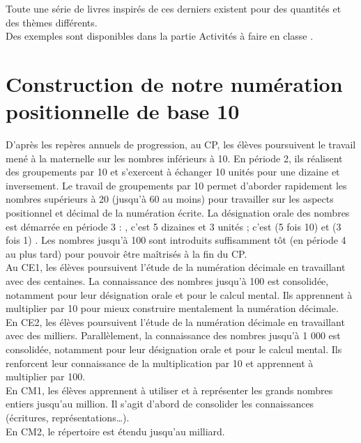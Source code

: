 Toute une série de livres inspirés de ces derniers existent pour des quantités et des thèmes différents. \\
Des exemples sont disponibles dans la partie \og Activités à faire en classe \fg.

\pagebreak


\section{Construction de notre numération positionnelle de base 10}

   D'après les repères annuels de progression, au CP, les élèves poursuivent le travail mené à la maternelle sur les nombres inférieurs à 10. En période 2, ils réalisent des groupements par 10 et s'exercent à échanger 10 unités pour une dizaine et inversement. Le travail de groupements par 10 permet d’aborder rapidement les nombres supérieurs à 20 (jusqu’à 60 au moins) pour travailler sur les aspects positionnel et décimal de la numération écrite. La désignation orale des nombres est démarrée en période 3 : , c’est 5 dizaines et 3 unités ; c’est (5 fois 10) et (3 fois 1) \fg. Les nombres jusqu’à 100 sont introduits suffisamment tôt (en période 4 au plus tard) pour pouvoir être maîtrisés à la fin du CP. \\ 
   Au CE1, les élèves poursuivent l’étude de la numération décimale en travaillant avec des centaines. La connaissance des nombres jusqu’à 100 est consolidée, notamment pour leur désignation orale et pour le calcul mental. Ils apprennent à multiplier par 10 pour mieux construire mentalement la numération décimale. \\
   En CE2, les élèves poursuivent l’étude de la numération décimale en travaillant avec des milliers. Parallèlement, la connaissance des nombres jusqu’à 1 000 est consolidée, notamment pour leur désignation orale et pour le calcul mental. Ils renforcent leur connaissance de la multiplication par 10 et apprennent à multiplier par 100. \\
   En CM1, les élèves apprennent à utiliser et à représenter les grands nombres entiers jusqu’au million. Il s'agit d'abord de consolider les connaissances (écritures, représentations\dots). \\
   En CM2, le répertoire est étendu jusqu’au milliard. \\

